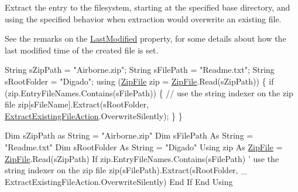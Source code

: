 Extract the entry to the filesystem, starting at the specified base directory, and using the specified behavior when extraction would overwrite an existing file. 

See the remarks on the \mbox{\hyperlink{class_super_tiled2_unity_1_1_ionic_1_1_zip_1_1_zip_entry_acd1234fd27c216b59c166c2b96aba3dd}{Last\+Modified}} property, for some details about how the last modified time of the created file is set. 


\begin{DoxyCode}
String sZipPath = \textcolor{stringliteral}{"Airborne.zip"};
String sFilePath = \textcolor{stringliteral}{"Readme.txt"};
String sRootFolder = \textcolor{stringliteral}{"Digado"};
\textcolor{keyword}{using} (\mbox{\hyperlink{namespace_super_tiled2_unity_1_1_ionic_1_1_zip_a9ced5352c56e7e0fceff15b534073c83a088ad16b06174c69965e232063ba6d16}{ZipFile}} zip = \mbox{\hyperlink{namespace_super_tiled2_unity_1_1_ionic_1_1_zip_a9ced5352c56e7e0fceff15b534073c83a088ad16b06174c69965e232063ba6d16}{ZipFile}}.Read(sZipPath))
\{
  \textcolor{keywordflow}{if} (zip.EntryFileNames.Contains(sFilePath))
  \{
    \textcolor{comment}{// use the string indexer on the zip file}
    zip[sFileName].Extract(sRootFolder,
                           \mbox{\hyperlink{namespace_super_tiled2_unity_1_1_ionic_1_1_zip_a3f8db7242d746d36b45114257b4fe4c0}{ExtractExistingFileAction}}.OverwriteSilently);
  \}
\}
\end{DoxyCode}



\begin{DoxyCode}
Dim sZipPath as String = \textcolor{stringliteral}{"Airborne.zip"}
Dim sFilePath As String = \textcolor{stringliteral}{"Readme.txt"}
Dim sRootFolder As String = \textcolor{stringliteral}{"Digado"}
Using zip As \mbox{\hyperlink{namespace_super_tiled2_unity_1_1_ionic_1_1_zip_a9ced5352c56e7e0fceff15b534073c83a088ad16b06174c69965e232063ba6d16}{ZipFile}} = \mbox{\hyperlink{namespace_super_tiled2_unity_1_1_ionic_1_1_zip_a9ced5352c56e7e0fceff15b534073c83a088ad16b06174c69965e232063ba6d16}{ZipFile}}.Read(sZipPath)
  If zip.EntryFileNames.Contains(sFilePath)
    \textcolor{stringliteral}{' use the string indexer on the zip file}
\textcolor{stringliteral}{    zip(sFilePath).Extract(sRootFolder, \_}
\textcolor{stringliteral}{                           ExtractExistingFileAction.OverwriteSilently)}
\textcolor{stringliteral}{  End If}
\textcolor{stringliteral}{End Using}
\end{DoxyCode}
 


